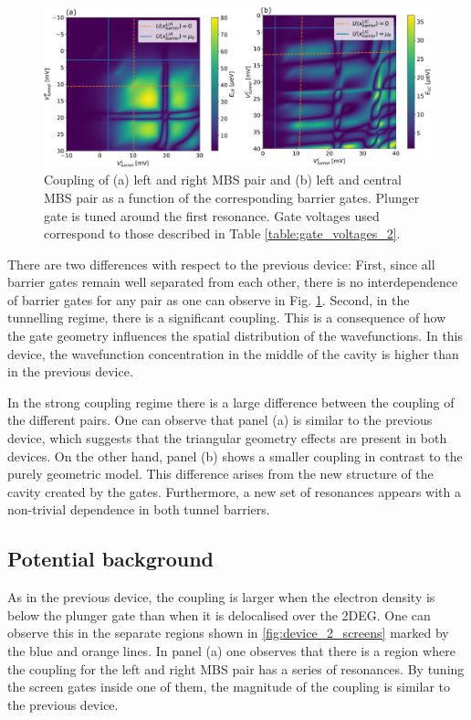 \begin{figure}
\centering
  \includegraphics[width=\linewidth]{figures/device_2_barriers.pdf}
  \caption{Coupling of (a) left and right MBS pair and (b) left and central MBS pair as a function of the corresponding barrier gates. Plunger gate is tuned around the first resonance. Gate voltages used correspond to those described in Table \ref{table:gate_voltages_2}.}
  \label{fig:device_2_barriers}
\end{figure}

There are two differences with respect to the previous device:
First, since all barrier gates remain well separated from each other, there is no interdependence of barrier gates for any pair as one can observe in Fig. \ref{fig:device_2_barriers}.
Second, in the tunnelling regime, there is a significant coupling.
This is a consequence of how the gate geometry influences the spatial distribution of the wavefunctions.
In this device, the wavefunction concentration in the middle of the cavity is higher than in the previous device.

In the strong coupling regime there is a large difference between the coupling of the different pairs.
One can observe that panel (a) is similar to the previous device, which suggests that the triangular geometry effects are present in both devices.
On the other hand, panel (b) shows a smaller coupling in contrast to the purely geometric model.
This difference arises from the new structure of the cavity created by the gates.
Furthermore, a new set of resonances appears with a non-trivial dependence in both tunnel barriers.

\subsection{Potential background}

As in the previous device, the coupling is larger when the electron density is below the plunger gate than when it is delocalised over the 2DEG.
One can observe this in the separate regions shown in \ref{fig:device_2_screens} marked by the blue and orange lines.
In panel (a) one observes that there is a region where the coupling for the left and right MBS pair has a series of resonances.
By tuning the screen gates inside one of them, the magnitude of the coupling is similar to the previous device.

